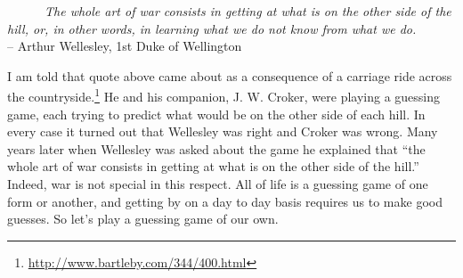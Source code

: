 \documentclass[
]{book}
\begin{document}
~~~~~~\emph{The whole art of war consists in getting at what is on the other side of the hill, or, in other words, in learning what we do not know from what we do.}\\
\hspace*{0.333em}\hspace*{0.333em}\hspace*{0.333em}\hspace*{0.333em}\hspace*{0.333em}\hspace*{0.333em}\hspace*{0.333em}\hspace*{0.333em}\hspace*{0.333em}\hspace*{0.333em}\hspace*{0.333em}\hspace*{0.333em}\hspace*{0.333em}\hspace*{0.333em}\hspace*{0.333em}\hspace*{0.333em}\hspace*{0.333em}\hspace*{0.333em}\hspace*{0.333em}\hspace*{0.333em}\hspace*{0.333em}\hspace*{0.333em}\hspace*{0.333em}\hspace*{0.333em}\hspace*{0.333em}\hspace*{0.333em}\hspace*{0.333em}\hspace*{0.333em}\hspace*{0.333em}\hspace*{0.333em}-- Arthur Wellesley, 1st Duke of Wellington

I am told that quote above came about as a consequence of a carriage ride across the countryside.\footnote{\url{http://www.bartleby.com/344/400.html}} He and his companion, J. W. Croker, were playing a guessing game, each trying to predict what would be on the other side of each hill. In every case it turned out that Wellesley was right and Croker was wrong. Many years later when Wellesley was asked about the game he explained that ``the whole art of war consists in getting at what is on the other side of the hill.'' Indeed, war is not special in this respect. All of life is a guessing game of one form or another, and getting by on a day to day basis requires us to make good guesses. So let's play a guessing game of our own.
\end{document}
